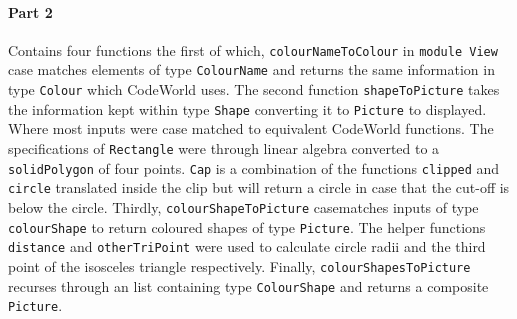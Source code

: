 \documentclass[11pt]{article}
\begin{document}
\paragraph{Part 2} Contains four functions the first of which, \verb|colourNameToColour| in \verb|module View|  case matches elements of  type \verb|ColourName| and returns the same information in type  \verb|Colour| which CodeWorld uses. The second function \verb|shapeToPicture| takes the information kept within type \verb|Shape| converting it to \verb|Picture| to displayed. Where most inputs were case matched to equivalent CodeWorld functions. The specifications of \verb|Rectangle| were through linear algebra converted to a \verb|solidPolygon| of four points.  \verb|Cap| is a combination of the functions \verb|clipped| and \verb|circle| translated inside the clip but will return a circle in case that the cut-off is below the circle. Thirdly, \verb|colourShapeToPicture| casematches inputs of type \verb|colourShape| to return coloured shapes of type \verb|Picture|. The helper functions \verb|distance| and \verb|otherTriPoint| were used to calculate circle radii and the third point of the isosceles triangle respectively. Finally, \verb|colourShapesToPicture| recurses through an list containing type \verb|ColourShape| and returns a composite \verb|Picture|.
\end{document}
